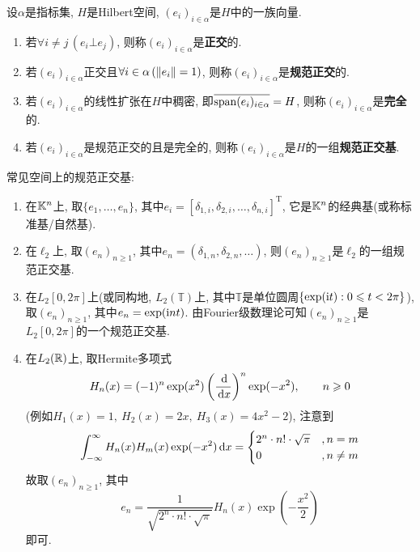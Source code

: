     \begin{Definition}[规范正交基]
    设$ \alpha $是指标集, $ H $是Hilbert空间, $ (e_i)_{i\in\alpha} $是$ H $中的一族向量.
    \begin{enumerate}[(1)]
    \item 若$ \forall i\ne j\,(e_i\bot e_j) $, 则称$ (e_i)_{i\in\alpha} $是\textbf{正交}的.
    \item 若$ (e_i)_{i\in\alpha} $正交且$ \forall i\in\alpha\,(\left\| e_i \right\|=1) $, 则称$ (e_i)_{i\in\alpha} $是\textbf{规范正交}的.
    \item 若$ (e_i)_{i\in\alpha} $的线性扩张在$ H $中稠密, 即$ \overline{\operatorname{span} (e_i)_{i\in\alpha}}=H $, 则称$ (e_i)_{i\in\alpha} $是\textbf{完全}的.
    \item 若$ (e_i)_{i\in\alpha} $是规范正交的且是完全的, 则称$ (e_i)_{i\in\alpha} $是$ H $的一组\textbf{规范正交基}.
    \end{enumerate}
    \end{Definition}
    
    \begin{Example}
    常见空间上的规范正交基:
    \begin{enumerate}[(1)]
    \item 在$ \mathbb{K}^n $上, 取$ \{ e_1, \dots,e_n \} $, 其中$ e_i=[\delta_{1,i},\delta_{2,i}, \dots,\delta_{n,i}]^\mathrm T $, 它是$ \mathbb{K}^n $的经典基(或称标准基/自然基).
    \item 在$ \ell_2 $上, 取$ (e_n)_{n\geqslant 1} $, 其中$ e_n=(\delta_{1,n},\delta_{2,n}, \dots) $, 则$ (e_n)_{n\geqslant 1} $是$ \ell_2 $的一组规范正交基.
    \item 在$ L_2[0,2\pi] $上(或同构地, $ L_2(\mathbb{T}) $上, 其中$ \mathbb{T} $是单位圆周$ \{ \exp(\mathrm{i} t) : 0\leqslant t<2\pi \} $), 取$ (e_n)_{n\geqslant 1} $, 其中$ e_n=\exp(\mathrm{i} nt) $. 由Fourier级数理论可知$ (e_n)_{n\geqslant 1} $是$ L_2[0,2\pi] $的一个规范正交基.
    \item 在$ L_2(\mathbb{R}) $上, 取Hermite多项式
    \[
    H_n(x)=(-1)^n\exp(x^2)\left(\frac{\,\mathrm{d}}{\,\mathrm{d} x}\right)^n\exp(-x^2),\qquad n\geqslant 0
    \]
    (例如$ H_1(x)=1,\ H_2(x)=2x,\ H_3(x)=4x^2-2 $), 注意到
    \[
    \int_{-\infty}^{\infty}H_n(x)H_m(x)\exp(-x^2)\,\mathrm{d} x=\begin{cases}
    2^n\cdot n!\cdot\sqrt{\pi} & ,n=m\\ 0 & ,n\ne m
    \end{cases}
    \]
    故取$ (e_n)_{n\geqslant 1} $, 其中
    \[
    e_n=\frac{1}{\sqrt{2^n\cdot n!\cdot\sqrt{\pi}}}H_n(x)\exp\left(-\frac{x^2}{2}\right)
    \]
    即可.
    \end{enumerate}
    \end{Example}
    
